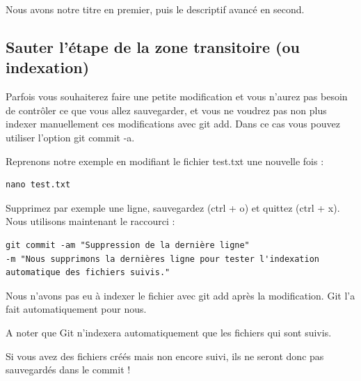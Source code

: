 \documentclass{article}
\begin{document}
Nous avons notre titre en premier, puis le descriptif avancé en second.

\subsection{Sauter l'étape de la zone transitoire (ou indexation)}
Parfois vous souhaiterez faire une petite modification et vous n'aurez pas besoin de contrôler ce que vous allez sauvegarder, et vous ne voudrez pas non plus indexer manuellement ces modifications avec {\color{blue}git add}. Dans ce cas vous pouvez utiliser l'option {\color{blue}git commit -a}.

Reprenons notre exemple en modifiant le fichier test.txt une nouvelle fois :


\begin{verbatim}
nano test.txt
\end{verbatim}

Supprimez par exemple une ligne, sauvegardez ({\color{blue}ctrl + o}) et quittez ({\color{blue}ctrl + x}). Nous utilisons maintenant le raccourci :

\begin{verbatim}
git commit -am "Suppression de la dernière ligne" 
-m "Nous supprimons la dernières ligne pour tester l'indexation automatique des fichiers suivis."
\end{verbatim}

Nous n'avons pas eu à indexer le fichier avec {\color{blue}git add} après la modification. {\color{blue}Git} l'a fait automatiquement pour nous.

A noter que {\color{blue}Git} n'indexera automatiquement que les fichiers qui sont suivis.

Si vous avez des fichiers créés mais non encore suivi, ils ne seront donc pas sauvegardés dans le commit !
\end{document}
